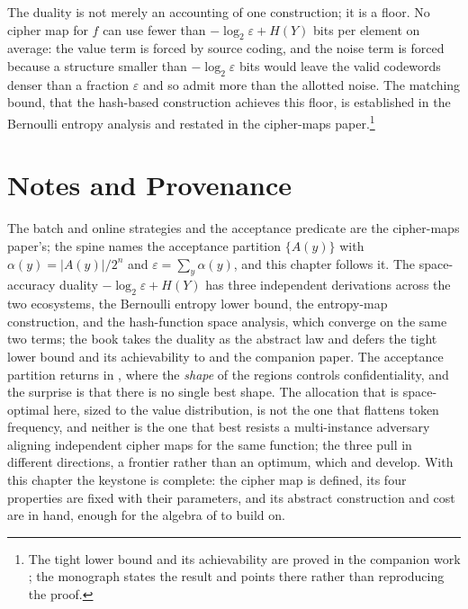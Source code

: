 \begin{remark}[Optimality]
\label{rem:lower-bound}
The duality is not merely an accounting of one construction; it is a floor.
No cipher map for $f$ can use fewer than $-\log_2\varepsilon + H(Y)$ bits per
element on average: the value term is forced by source coding, and the noise
term is forced because a structure smaller than $-\log_2\varepsilon$ bits
would leave the valid codewords denser than a fraction $\varepsilon$ and so
admit more than the allotted noise. The matching bound, that the
hash-based construction achieves this floor, is established in the
Bernoulli entropy analysis and restated in the cipher-maps
paper.\footnote{The tight lower bound and its achievability are proved in the
companion work \cite{towell2026cipher}; the monograph states the result and
points there rather than reproducing the proof.}
\end{remark}

\section{Notes and Provenance}
\label{sec:ch5-notes}

The batch and online strategies and the acceptance predicate are the
cipher-maps paper's; the spine names the acceptance partition $\{A(y)\}$ with
$\alpha(y) = \lvert A(y)\rvert/2^n$ and $\varepsilon = \sum_y \alpha(y)$, and
this chapter follows it. The space-accuracy duality $-\log_2\varepsilon +
H(Y)$ has three independent derivations across the two ecosystems, the
Bernoulli entropy lower bound, the entropy-map construction, and the
hash-function space analysis, which converge on the same two terms; the book
takes the duality as the abstract law and defers the tight lower bound and
its achievability to  and the companion paper. The
acceptance partition returns in , where the
\emph{shape} of the regions controls confidentiality, and the surprise is
that there is no single best shape. The allocation that is space-optimal
here, sized to the value distribution, is not the one that flattens token
frequency, and neither is the one that best resists a multi-instance
adversary aligning independent cipher maps for the same function; the three
pull in different directions, a frontier rather than an optimum, which
 and  develop. With this chapter the keystone is complete: the cipher map is
defined, its four properties are fixed with their parameters, and its
abstract construction and cost are in hand, enough for the algebra of
 to build on.
